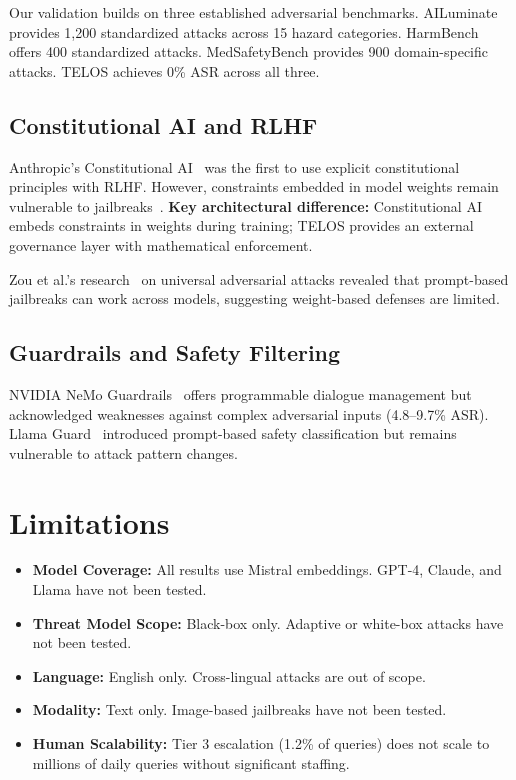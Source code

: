 \documentclass[11pt,twocolumn]{article}
\begin{document}
Our validation builds on three established adversarial benchmarks. AILuminate provides 1,200 standardized attacks across 15 hazard categories. HarmBench offers 400 standardized attacks. MedSafetyBench provides 900 domain-specific attacks. TELOS achieves 0\% ASR across all three.

\subsection{Constitutional AI and RLHF}

Anthropic's Constitutional AI~\citep{bai2022constitutional} was the first to use explicit constitutional principles with RLHF. However, constraints embedded in model weights remain vulnerable to jailbreaks~\citep{wei2023jailbroken}. \textbf{Key architectural difference:} Constitutional AI embeds constraints in weights during training; TELOS provides an external governance layer with mathematical enforcement.

Zou et al.'s research~\citep{zou2023universal} on universal adversarial attacks revealed that prompt-based jailbreaks can work across models, suggesting weight-based defenses are limited.

\subsection{Guardrails and Safety Filtering}

NVIDIA NeMo Guardrails~\citep{rebedea2023nemo} offers programmable dialogue management but acknowledged weaknesses against complex adversarial inputs (4.8--9.7\% ASR). Llama Guard~\citep{inan2023llamaguard} introduced prompt-based safety classification but remains vulnerable to attack pattern changes.

\section{Limitations}

\begin{itemize}
    \item \textbf{Model Coverage:} All results use Mistral embeddings. GPT-4, Claude, and Llama have not been tested.
    \item \textbf{Threat Model Scope:} Black-box only. Adaptive or white-box attacks have not been tested.
    \item \textbf{Language:} English only. Cross-lingual attacks are out of scope.
    \item \textbf{Modality:} Text only. Image-based jailbreaks have not been tested.
    \item \textbf{Human Scalability:} Tier 3 escalation (1.2\% of queries) does not scale to millions of daily queries without significant staffing.
\end{itemize}
\end{document}
